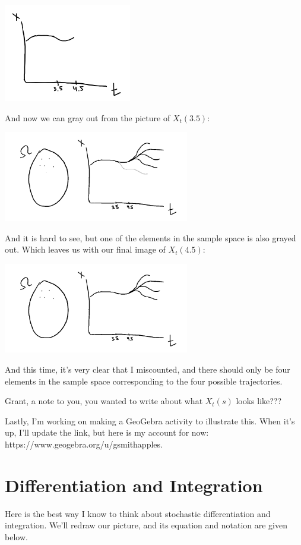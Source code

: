 \documentclass{article}
\begin{document}
\includegraphics[width=2.2in]{filtration_4.5.png}
\centering

And now we can gray out from the picture of $X_t(3.5)$:

\includegraphics[width=3.2in]{Filtration_grayed_4.5.png}
\centering

And it is hard to see, but one of the elements in the sample space is also grayed out. Which leaves us with our final image of $X_t(4.5)$:

\includegraphics[width=3.2in]{final_4.5.png}
\centering

And this time, it's very clear that I miscounted, and there should only be four elements in the sample space corresponding to the four possible trajectories.

Grant, a note to you, you wanted to write about what $X_t(s)$ looks like???

Lastly, I'm working on making a GeoGebra activity to illustrate this. When it's up, I'll update the link, but here is my account for now: https://www.geogebra.org/u/gsmithapples.

\section{Differentiation and Integration}
Here is the best way I know to think about stochastic differentiation and integration. We'll redraw our picture, and its equation and notation are given below.
\end{document}
